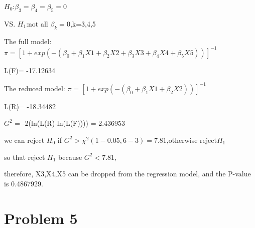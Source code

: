 \documentclass{article}\usepackage[]{graphicx}\usepackage[]{color}
\begin{document}
\begin{enumerate}[(a)]
\begin{center}
$H_0$:$\beta_3=\beta_4=\beta_5=0$

VS. $H_1$:not all $\beta_k=0$,k=3,4,5

The full model: $\pi = [1 + exp(-(\beta_0 + \beta_1 X1 + \beta_2 X2 + \beta_3 X3 + \beta_4 X4 + \beta_5 X5))]^{-1} $

L(F)= -17.12634

The reduced model: $\pi = [1 + exp(-(\beta_0 + \beta_1 X1 + \beta_2 X2))]^{-1} $

L(R)= -18.34482

$G^2$ = -2(ln(L(R)-ln(L(F)))) = 2.436953

we can reject $H_0$ if $G^2 > \chi^2(1-0.05, 6-3)=7.81$,otherwise reject$H_1$

so that reject $H_1$ because $G^2 <7.81$,

therefore, X3,X4,X5 can be dropped from the regression model, and the P-value is 0.4867929.
\end{center}

\end{enumerate}

\section{Problem 5}
\end{document}
